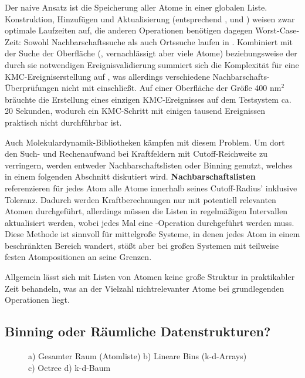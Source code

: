 Der naive Ansatz ist die Speicherung aller Atome in einer globalen Liste.
Konstruktion, Hinzufügen und Aktualisierung (entsprechend ,  und ) weisen zwar optimale Laufzeiten auf, die anderen Operationen benötigen dagegen Worst-Case-Zeit:
Sowohl Nachbarschaftssuche als auch Ortssuche laufen in .
Kombiniert mit der Suche der Oberfläche (, vernachlässigt aber viele Atome) beziehungsweise der durch sie notwendigen Ereignisvalidierung summiert sich die Komplexität für eine KMC-Ereigniserstellung auf , was allerdings verschiedene Nachbarschafts-Überprüfungen nicht mit einschließt.
Auf einer Oberfläche der Größe 400 nm$^2$ bräuchte die Erstellung eines einzigen KMC-Ereignisses auf dem Testsystem ca. 20 Sekunden, wodurch ein KMC-Schritt mit einigen tausend Ereignissen praktisch nicht durchführbar ist.

Auch Molekulardynamik-Bibliotheken kämpfen mit diesem Problem.
Um dort den Such- und Rechenaufwand bei Kraftfeldern mit Cutoff-Reichweite zu verringern, werden entweder Nachbarschaftslisten oder Binning genutzt, welches in einem folgenden Abschnitt diskutiert wird.
\textbf{Nachbarschaftslisten} referenzieren für jedes Atom alle Atome innerhalb seines Cutoff-Radius' inklusive Toleranz.
Dadurch werden Kraftberechnungen nur mit potentiell relevanten Atomen durchgeführt, allerdings müssen die Listen in regelmäßigen Intervallen aktualisiert werden, wobei jedes Mal eine -Operation durchgeführt werden muss.
Diese Methode ist sinnvoll für mittelgroße Systeme, in denen jedes Atom in einem beschränkten Bereich wandert, stößt aber bei großen Systemen mit teilweise festen Atompositionen an seine Grenzen.

Allgemein lässt sich mit Listen von Atomen keine große Struktur in praktikabler Zeit behandeln, was an der Vielzahl nichtrelevanter Atome bei grundlegenden Operationen liegt.

\subsection{Binning oder Räumliche Datenstrukturen?}


\begin{figure}[btp]
  \centering
  \def\svgwidth{\textwidth}
  
  \caption[Räumliche Datenstrukturen]{
    a) Gesamter Raum (Atomliste)
    b) Lineare Bins (k-d-Arrays)
    \\
    c) Octree
    d) k-d-Baum
  }
  \label{fig:datastructures}
\end{figure}

